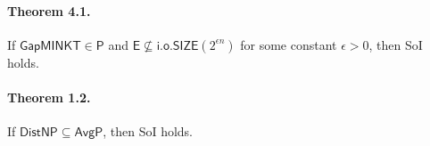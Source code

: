 \paragraph{Theorem 4.1.}
If $\mathsf{GapMINKT}\in\mathsf P$ and $\mathsf E\not\subseteq\mathsf{i.o.SIZE}(2^{\epsilon n})$ for some constant $\epsilon>0$, then SoI holds.
\paragraph{Theorem 1.2.}
If $\mathsf{DistNP}\subseteq\mathsf{AvgP}$, then SoI holds.

